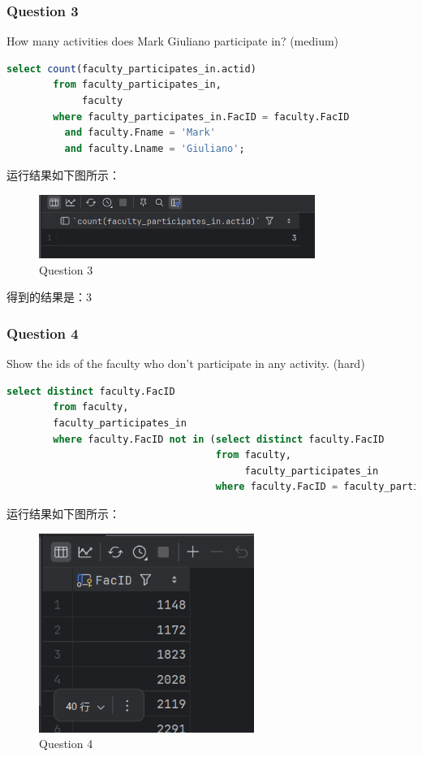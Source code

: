 \documentclass{article}
\begin{document}
    \subsubsection{Question 3}
    
    How many activities does Mark Giuliano participate in?  (medium)
    
    \begin{lstlisting}[language=sql, title=Question 3, tabsize=4]
    	select count(faculty_participates_in.actid)
    	from faculty_participates_in,
    		 faculty
    	where faculty_participates_in.FacID = faculty.FacID
    	  and faculty.Fname = 'Mark'
    	  and faculty.Lname = 'Giuliano';
    \end{lstlisting}
    
    运行结果如下图所示：
    
    \begin{figure}[H]
    	\centering
    	\includegraphics[width=9cm]{./images/6.Question3.png}
    	\caption{Question 3}
    \end{figure}
    
    得到的结果是：3
    
    \subsubsection{Question 4}
    
    Show the ids of the faculty who don't participate in any activity.  (hard)
    
    \begin{lstlisting}[language=sql, title=Question 4, tabsize=4]
    	select distinct faculty.FacID
    	from faculty,
    	faculty_participates_in
    	where faculty.FacID not in (select distinct faculty.FacID
    								from faculty,
    									 faculty_participates_in
    								where faculty.FacID = faculty_participates_in.FacID);
    \end{lstlisting}
    
    运行结果如下图所示：
    
    \begin{figure}[H]
    	\centering
    	\includegraphics[width=7cm]{./images/7.Question4.png}
    	\caption{Question 4}
    \end{figure}
    
\end{document}
